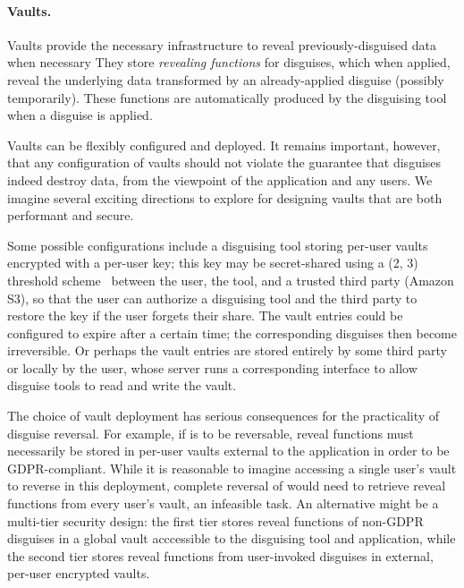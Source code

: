 \paragraph{Vaults.}

Vaults provide the necessary infrastructure to reveal previously-disguised data when
necessary
%
They store \emph{revealing functions} for disguises, which when applied, reveal the underlying
data transformed by an already-applied disguise (possibly temporarily). These functions are
automatically produced by the disguising tool when a disguise is applied.
%

%
Vaults can be flexibly configured and deployed. It remains important, however, that any
configuration of vaults should not violate the guarantee that disguises indeed destroy data,
from the viewpoint of the application and any users.
We imagine several exciting directions to explore for designing vaults that are both
performant and secure.
%

%
Some possible configurations include a disguising tool storing per-user vaults encrypted with a per-user key; this key
may be secret-shared using a (2, 3) threshold scheme~\cite{secretsharing} between the user, the
tool, and a trusted third party (\eg Amazon S3), so that the user can authorize a disguising tool and the
third party to restore the key if the user forgets their share.
%
The vault entries could be configured to expire after a certain time; the corresponding disguises
then become irreversible.
%
Or perhaps the vault entries are stored entirely by some third party or locally by the user, whose
server runs a corresponding interface to allow disguise tools to read and write the vault.

The choice of vault deployment has serious consequences for the practicality of disguise reversal.
For example, if \gdpr is to be reversable, reveal functions must necessarily be stored in per-user
vaults external to the application in order to be GDPR-compliant.  While it is reasonable to imagine
accessing a single user's vault to reverse \gdpr in this deployment, complete reversal of \ca would
need to retrieve reveal functions from every user's vault, an infeasible task.
%
An alternative might be a multi-tier security design: the first tier stores reveal functions of
non-GDPR disguises in a global vault acccessible to the disguising tool and application, while the
second tier stores reveal functions from user-invoked disguises in external, per-user encrypted
vaults.

